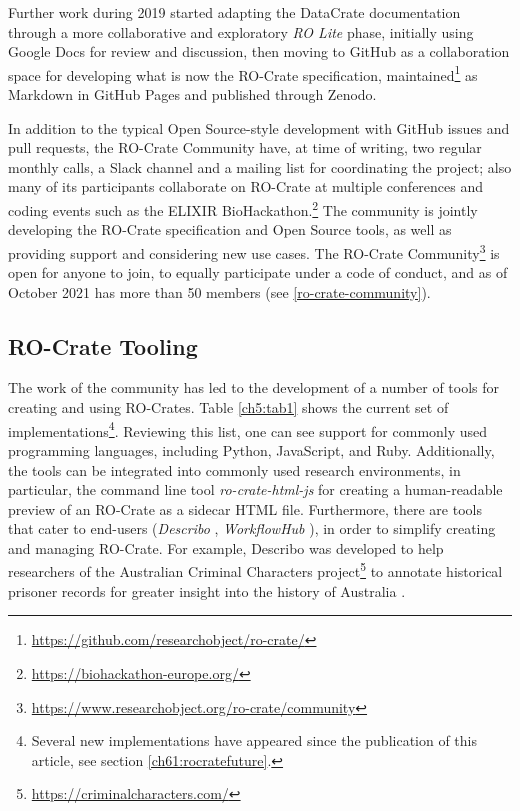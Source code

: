 Further work during 2019 started adapting the DataCrate documentation
through a more collaborative and exploratory \emph{RO Lite} phase,
initially using Google Docs for review and discussion, then moving to
GitHub as a collaboration space for developing what is now the RO-Crate
specification, maintained\footnote{\url{https://github.com/researchobject/ro-crate/}} as
Markdown in GitHub Pages
and published through Zenodo.

In addition to the typical Open Source-style development with GitHub
issues and pull requests, the RO-Crate Community have, at time of
writing, two regular monthly calls, a Slack channel and a mailing list
for coordinating the project; also many of its participants collaborate
on RO-Crate at multiple conferences and coding events such as the
ELIXIR BioHackathon.\footnote{\url{https://biohackathon-europe.org/}} The community
is jointly developing the RO-Crate specification and Open Source tools,
as well as providing support and considering new use cases. The
RO-Crate Community\footnote{\url{https://www.researchobject.org/ro-crate/community}}
is open for anyone to join, to equally participate under a code of
conduct, and as of October 2021 has more than 50 members (see \vref{ro-crate-community}).

\subsection{RO-Crate Tooling}\label{ch5:tooling}

The work of the community has led to the development of a number of
tools for creating and using RO-Crates. Table \vref{ch5:tab1} shows the current set
of implementations\footnote{
  Several new implementations have appeared since the publication of this article, see section \vref{ch61:rocratefuture}.
}. Reviewing this list, one can see support for
commonly used programming languages, including Python, JavaScript, and
Ruby. Additionally, the tools can be integrated into commonly used
research environments, in particular, the command line tool
\textit{ro-crate-html-js} \cite{ch5-95} for creating a human-readable
preview of an RO-Crate as a sidecar HTML file. Furthermore, there are
tools that cater to end-users (\textit{Describo} \cite{ch5-78}, \textit{WorkflowHub}
\cite{ch5-124}), in order to simplify creating and managing
RO-Crate. For example, Describo was developed to help researchers of
the Australian Criminal Characters
project\footnote{\url{https://criminalcharacters.com/}} to annotate historical prisoner
records for greater insight into the history of Australia
\cite{ch5-97}.

